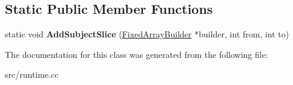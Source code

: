 \subsection*{Static Public Member Functions}
\begin{DoxyCompactItemize}
\item 
\hypertarget{classv8_1_1internal_1_1_replacement_string_builder_aba524477fe28f1c8ae3f7c9f2d969208}{}static void {\bfseries Add\+Subject\+Slice} (\hyperlink{classv8_1_1internal_1_1_fixed_array_builder}{Fixed\+Array\+Builder} $\ast$builder, int from, int to)\label{classv8_1_1internal_1_1_replacement_string_builder_aba524477fe28f1c8ae3f7c9f2d969208}

\end{DoxyCompactItemize}


The documentation for this class was generated from the following file\+:\begin{DoxyCompactItemize}
\item 
src/runtime.\+cc\end{DoxyCompactItemize}
